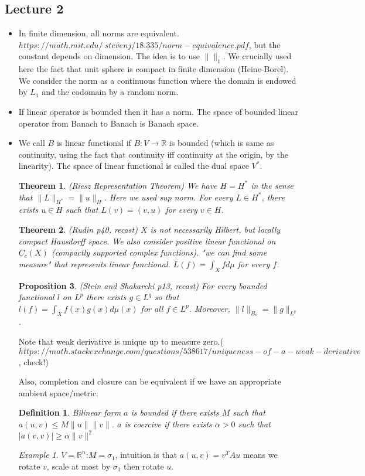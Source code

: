 \documentclass{article}
\newtheorem{theorem}{Theorem}
\newtheorem{proposition}[theorem]{Proposition}
\newtheorem{definition}{Definition}
\theoremstyle{remark}
\newtheorem{example}{Example}
\begin{document}
\subsection*{Lecture 2}
\begin{itemize}
\item In finite dimension, all norms are equivalent.
$https://math.mit.edu/~stevenj/18.335/norm-equivalence.pdf$, but the constant depends on dimension. The idea is to use $\lVert \rVert_1$. We crucially used here the fact that unit sphere is compact in finite dimension (Heine-Borel). We consider the norm as a continuous function where the domain is endowed by $L_1$ and the codomain by a random norm.
\item If linear operator is bounded then it has a norm. The space of bounded linear operator from Banach to Banach is Banach space.
\item We call $B$ is linear functional if $B:V\to\mathbb{R}$ is bounded (which is same as continuity, using the fact that continuity iff continuity at the origin, by the linearity). The space of linear functional is called the dual space $V^*$.
\begin{theorem} (Riesz Representation Theorem) We have $H=H^*$ in the sense that $\lVert L\rVert_{H^*}=\lVert u\rVert_H$. Here we used sup norm. For every $L\in H^*$, there exists $u\in H$ such that $L(v)=(v,u)$ for every $v\in H$.
\end{theorem}
\begin{theorem}
(Rudin p40, recast) $X$ is not necessarily Hilbert, but locally compact Hausdorff space. We also consider positive linear functional on $C_c (X)$ (compactly supported complex functions). "we can find some measure" that represents linear functional. $L(f)=\int_X f d\mu$ for every $f$.
\end{theorem}
\begin{proposition}
(Stein and Shakarchi p13, recast) For every bounded functional $l$ on $L^p$ there exists $g\in L^q$ so that $l(f)=\int_X f(x)g(x)d\mu (x)$ for all $f\in L^p$. Moreover, $\lVert l\rVert_{B_*}=\lVert g\rVert_{L^q}$.
\end{proposition}
Note that weak derivative is unique up to measure zero.($https://math.stackexchange.com/questions/538617/uniqueness-of-a-weak-derivative$, check!)

Also, completion and closure can be equivalent if we have an appropriate ambient space/metric.

\begin{definition}
Bilinear form $a$ is bounded if there exists $M$ such that $a(u,v)\leq M\lVert u\rVert\lVert v\rVert$. $a$ is coercive if there exists $\alpha>0$ such that $\lvert a(v,v)\rvert\geq\alpha\rVert v\rVert^2$
\end{definition}
\begin{example}
$V=\mathbb{R}^n$:$M=\sigma_1$, intuition is that $a(u,v)=v^T Au$ means we rotate $v$, scale at most by $\sigma_1$ then rotate $u$.


\end{example}
\end{itemize}
\end{document}

